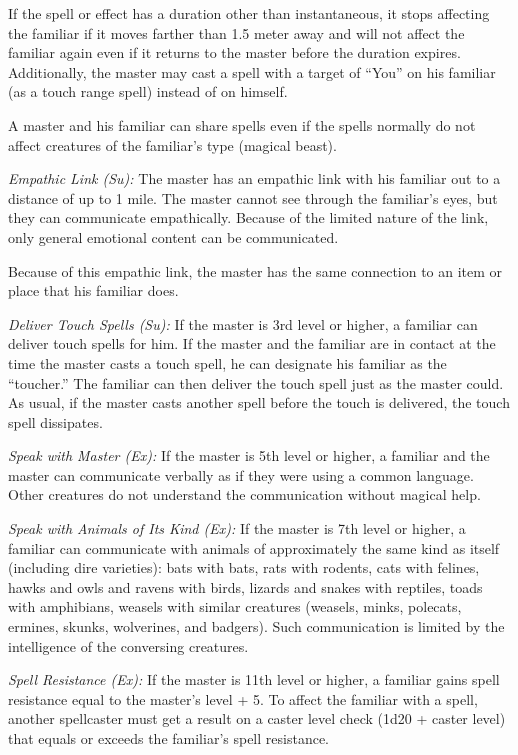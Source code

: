 If the spell or effect has a duration other than instantaneous, it stops affecting the familiar if it moves farther than 1.5 meter away and will not affect the familiar again even if it returns to the master before the duration expires. Additionally, the master may cast a spell with a target of ``You'' on his familiar (as a touch range spell) instead of on himself.

A master and his familiar can share spells even if the spells normally do not affect creatures of the familiar's type (magical beast).

\textit{Empathic Link (Su):} The master has an empathic link with his familiar out to a distance of up to 1 mile. The master cannot see through the familiar's eyes, but they can communicate empathically. Because of the limited nature of the link, only general emotional content can be communicated.

Because of this empathic link, the master has the same connection to an item or place that his familiar does.

\textit{Deliver Touch Spells (Su):} If the master is 3rd level or higher, a familiar can deliver touch spells for him. If the master and the familiar are in contact at the time the master casts a touch spell, he can designate his familiar as the ``toucher.'' The familiar can then deliver the touch spell just as the master could. As usual, if the master casts another spell before the touch is delivered, the touch spell dissipates.

\textit{Speak with Master (Ex):} If the master is 5th level or higher, a familiar and the master can communicate verbally as if they were using a common language. Other creatures do not understand the communication without magical help.

\textit{Speak with Animals of Its Kind (Ex):} If the master is 7th level or higher, a familiar can communicate with animals of approximately the same kind as itself (including dire varieties): bats with bats, rats with rodents, cats with felines, hawks and owls and ravens with birds, lizards and snakes with reptiles, toads with amphibians, weasels with similar creatures (weasels, minks, polecats, ermines, skunks, wolverines, and badgers). Such communication is limited by the intelligence of the conversing creatures.

\textit{Spell Resistance (Ex):} If the master is 11th level or higher, a familiar gains spell resistance equal to the master's level + 5. To affect the familiar with a spell, another spellcaster must get a result on a caster level check (1d20 + caster level) that equals or exceeds the familiar's spell resistance.

